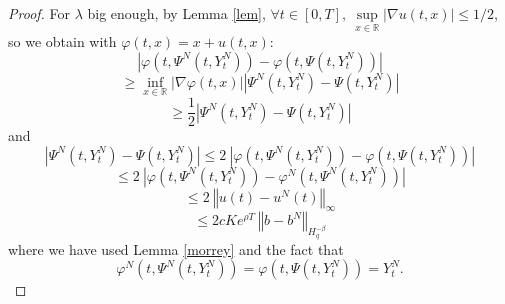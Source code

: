\documentclass[11pt]{article}
\newcommand{\norme}[1]{\left\Vert #1\right\Vert}
\newcommand{\R}{\mathbb{R}}
\begin{document}
\begin{proof}
    For $\lambda$ big enough, by Lemma \ref{lem}, $\forall t \in[0,T],\ \underset{x\in\R}{\sup}\left|\nabla u(t,x)\right| \leq 1/2$, so we obtain with $\varphi(t,x)=x+u(t,x)$:
    \begin{equation*}
    \left|\varphi\left(t,\Psi^N\left(t,Y_t^N\right)\right)-\varphi\left(t,\Psi\left(t,Y_t^N\right)\right)\right| 
    \end{equation*}
    \begin{equation*}
    \geq \underset{x\in\R}{\inf}\left|\nabla\varphi(t,x)\right|
    \left|\Psi^N\left(t,Y_t^N\right)-\Psi\left(t,Y_t^N\right)\right|
    \end{equation*}
    \begin{equation*}
    \geq \frac{1}{2} \left|\Psi^N\left(t,Y_t^N\right)-\Psi\left(t,Y_t^N\right)\right|
    \end{equation*}    
    and 
    \begin{equation*}
    \left|\Psi^N\left(t,Y_t^N\right)-\Psi\left(t,Y_t^N\right)\right|\leq 2\ \left|\varphi\left(t,\Psi^N\left(t,Y_t^N\right)\right)-\varphi\left(t,\Psi\left(t,Y_t^N\right)\right)\right|
    \end{equation*}   
    \begin{equation*}
    \leq 2\ \left|\varphi\left(t,\Psi^N\left(t,Y_t^N\right)\right)-\varphi^N\left(t,\Psi^N\left(t,Y_t^N\right)\right)\right|
    \end{equation*}   
    \begin{equation*}
    \leq 2\ \norme{u(t)-u^N(t)}_\infty
    \end{equation*} 
    \begin{equation}\label{other}
    \leq 2cKe^{\rho T}\ \norme{b-b^N}_{H^{-\beta}_q}
    \end{equation} 
    where we have used Lemma \ref{morrey} and the fact that \begin{equation*}
    \varphi^N\left(t,\Psi^N\left(t,Y_t^N\right)\right)=\varphi\left(t,\Psi\left(t,Y_t^N\right)\right) = Y_t^N.
    \end{equation*}
\end{proof}
   
\end{document}
